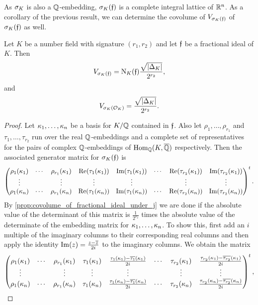     As \(\sigma_{K}\) is also a \(\mathbb{Q}\)-embedding, \(\sigma_{K}(\mathfrak{f})\) is a complete integral lattice of \(\mathbb{R}^{n}\). As a corollary of the previous result, we can determine the covolume of \(V_{\sigma_{K}(\mathfrak{f})}\) of \(\sigma_{K}(\mathfrak{f})\) as well.
    
    \begin{corollary}\label{cor:covolume_of_fractional_ideal_under_canonical_embedding}
      Let \(K\) be a number field with signature \((r_{1},r_{2})\) and let \(\mathfrak{f}\) be a fractional ideal of \(K\). Then
      \[
        V_{\sigma_{K}(\mathfrak{f})} = \operatorname{\mathrm{N}}_{K}(\mathfrak{f})\frac{\sqrt{|\Delta_{K}|}}{2^{r_{2}}},
      \]
      and
      \[
        V_{\sigma_{K}(\mathcal{O}_{K})} = \frac{\sqrt{|\Delta_{K}|}}{2^{r_{2}}}.
      \]
    \end{corollary}
    \begin{proof}
      Let \(\kappa_{1},\ldots,\kappa_{n}\) be a basis for \(K/\mathbb{Q}\) contained in \(\mathfrak{f}\). Also let \(\rho_{1},\ldots,\rho_{r_{1}}\) and \(\tau_{1},\ldots,\tau_{r_{2}}\) run over the real \(\mathbb{Q}\)-embeddings and a complete set of representatives for the pairs of complex \(\mathbb{Q}\)-embeddings of \(\operatorname{\mathrm{Hom}}_{\mathbb{Q}}(K,\overline{\mathbb{Q}})\) respectively. Then the associated generator matrix for \(\sigma_{K}(\mathfrak{f})\) is
      \[
        \begin{pmatrix} \rho_{1}(\kappa_{1}) & \cdots & \rho_{r_{1}}(\kappa_{1}) & \mathrm{Re}(\tau_{1}(\kappa_{1})) & \mathrm{Im}(\tau_{1}(\kappa_{1})) & \cdots & \mathrm{Re}(\tau_{r_{2}}(\kappa_{1})) & \mathrm{Im}(\tau_{r_{2}}(\kappa_{1})) \\ \vdots & & \vdots & \vdots & \vdots & & \vdots & \vdots \\ \rho_{1}(\kappa_{n}) & \cdots & \rho_{r_{1}}(\kappa_{n}) & \mathrm{Re}(\tau_{1}(\kappa_{n})) & \mathrm{Im}(\tau_{1}(\kappa_{n})) & \cdots & \mathrm{Re}(\tau_{r_{2}}(\kappa_{n})) & \mathrm{Im}(\tau_{r_{2}}(\kappa_{n})) \end{pmatrix}^{t}.
      \]
      By \cref{prop:covolume_of_fractional_ideal_under_j} we are done if the absolute value of the determinant of this matrix is \(\frac{1}{2^{r_{2}}}\) times the absolute value of the determinate of the embedding matrix for \(\kappa_{1},\ldots,\kappa_{n}\). To show this, first add an \(i\) multiple of the imaginary columns to their corresponding real columns and then apply the identity \(\mathrm{Im}(z) = \frac{z-\overline{z}}{2i}\) to the imaginary columns. We obtain the matrix
      \[
        \begin{pmatrix} \rho_{1}(\kappa_{1}) & \cdots & \rho_{r_{1}}(\kappa_{1}) & \tau_{1}(\kappa_{1}) & \frac{\tau_{1}(\kappa_{1})-\overline{\tau_{1}}(\kappa_{1})}{2i} & \cdots & \tau_{r_{2}}(\kappa_{1}) & \frac{\tau_{r_{2}}(\kappa_{1})-\overline{\tau_{r_{2}}}(\kappa_{1})}{2i} \\ \vdots & & \vdots & \vdots & \vdots & & \vdots & \vdots \\ \rho_{1}(\kappa_{n}) & \cdots & \rho_{r_{1}}(\kappa_{n}) & \tau_{1}(\kappa_{n}) & \frac{\tau_{1}(\kappa_{n})-\overline{\tau_{1}}(\kappa_{n})}{2i} & \cdots & \tau_{r_{2}}(\kappa_{n}) & \frac{\tau_{r_{2}}(\kappa_{n})-\overline{\tau_{r_{2}}}(\kappa_{n})}{2i} \end{pmatrix}^{t},
\]
\end{proof}
